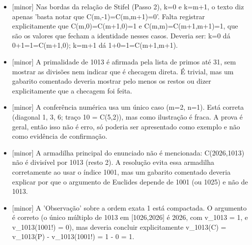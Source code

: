 \documentclass{article}%
\begin{document}
\begin{itemize}%
\item%
{[}minor{]} Nas bordas da relação de Stifel (Passo 2), k=0 e k=m+1, o texto diz apenas 'basta notar que C(m,{-}1)=C(m,m+1)=0'. Falta registrar explicitamente que C(m,0)=C(m+1,0)=1 e C(m,m)=C(m+1,m+1)=1, que são os valores que fecham a identidade nesses casos. Deveria ser: k=0 dá 0+1=1=C(m+1,0); k=m+1 dá 1+0=1=C(m+1,m+1).%
\item%
{[}minor{]} A primalidade de 1013 é afirmada pela lista de primos até 31, sem mostrar as divisões nem indicar que é checagem direta. É trivial, mas um gabarito comentado deveria mostrar pelo menos os restos ou dizer explicitamente que a checagem foi feita.%
\item%
{[}minor{]} A conferência numérica usa um único caso (m=2, n=1). Está correta (diagonal 1, 3, 6; traço 10 = C(5,2)), mas como ilustração é fraca. A prova é geral, então isso não é erro, só poderia ser apresentado como exemplo e não como evidência de confirmação.%
\item%
{[}minor{]} A armadilha principal do enunciado não é mencionada: C(2026,1013) não é divisível por 1013 (resto 2). A resolução evita essa armadilha corretamente ao usar o índice 1001, mas um gabarito comentado deveria explicar por que o argumento de Euclides depende de 1001 (ou 1025) e não de 1013.%
\item%
{[}minor{]} A 'Observação' sobre a ordem exata 1 está compactada. O argumento é correto (o único múltiplo de 1013 em {[}1026,2026{]} é 2026, com v\_1013 = 1, e v\_1013(1001!) = 0), mas deveria concluir explicitamente v\_1013(C) = v\_1013(P) - v\_1013(1001!) = 1 - 0 = 1.%
\end{itemize}%
\end{document}
